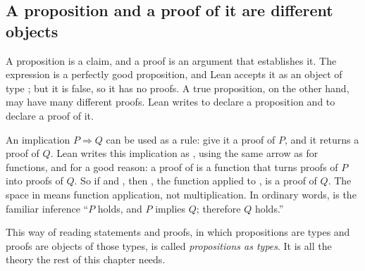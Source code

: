 \subsection*{A proposition and a proof of it are different objects}
A proposition is a claim, and a proof is an argument that establishes it. The expression  is a perfectly good proposition, and Lean accepts it as an object of type ; but it is false, so it has no proofs. A true proposition, on the other hand, may have many different proofs. Lean writes  to declare a proposition and  to declare a proof of it.

An implication $P\Rightarrow Q$ can be used as a rule: give it a proof of $P$, and it returns a proof of $Q$. Lean writes this implication as , using the same arrow as for functions, and for a good reason: a proof of  is a function that turns proofs of $P$ into proofs of $Q$. So if  and , then , the function  applied to , is a proof of $Q$. The space in  means function application, not multiplication. In ordinary words,  is the familiar inference ``$P$ holds, and $P$ implies $Q$; therefore $Q$ holds.''

This way of reading statements and proofs, in which propositions are types and proofs are objects of those types, is called \emph{propositions as types}. It is all the theory the rest of this chapter needs.


